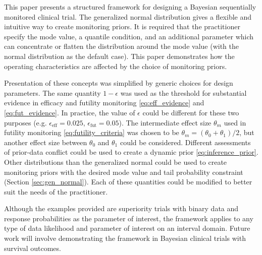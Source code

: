 \documentclass[useAMS,usenatbib,referee]{biom}
\begin{document}
This paper presents a structured framework for designing a Bayesian sequentially monitored clinical trial. The generalized normal distribution gives a flexible and intuitive way to create monitoring priors. It is required that the practitioner specify the mode value, a quantile condition, and an additional parameter which can concentrate or flatten the distribution around the mode value (with the normal distribution as the default case). This paper demonstrates how the operating characteristics are affected by the choice of monitoring priors.

Presentation of these concepts was simplified by generic choices for design parameters. The same quantity $1-\epsilon$ was used as the threshold for substantial evidence in efficacy and futility monitoring \eqref{eq:eff_evidence} and \eqref{eq:fut_evidence}. In practice, the value of $\epsilon$ could be different for these two purposes (e.g. $\epsilon_{\text{eff}}=0.025$, $\epsilon_{\text{fut}}=0.05$). The intermediate effect size $\theta_m$ used in futility monitoring \eqref{eq:futility_criteria} was chosen to be $\theta_m=(\theta_0+\theta_1)/2$, but another effect size between $\theta_0$ and $\theta_1$ could be considered. Different assessments of prior-data conflict could be used to create a dynamic prior \eqref{eq:inference_prior}. Other distributions than the generalized normal could be used to create monitoring priors with the desired mode value and tail probability constraint (Section \ref{sec:gen_normal}). Each of these quantities could be modified to better suit the needs of the practitioner. 

Although the examples provided are superiority trials with binary data and response probabilities as the parameter of interest, the framework applies to any type of data likelihood and parameter of interest on an interval domain. Future work will involve demonstrating the framework in Bayesian clinical trials with survival outcomes.

\end{document}
